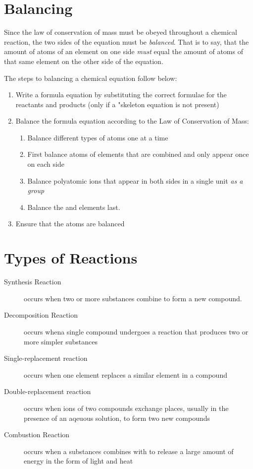 \section{Balancing}
Since the law of conservation of mass must be obeyed throughout a chemical
reaction, the two sides of the equation must be \textit{balanced}.  That is to
say, that the amount of atoms of an element on one side \textit{must} equal the
amount of atoms of that same element on the other side of the equation.

The steps to balancing a chemical equation follow below:

\begin{enumerate}
  \item Write a formula equation by substituting the correct formulae for the
    reactants and products (only if a "skeleton equation is not present)
  \item Balance the formula equation according to the Law of Conservation of
    Mass:
    \begin{enumerate}
      \item Balance different types of atoms one at a time
      \item First balance atoms of elements that are combined and only appear
        once on each side
      \item Balance polyatomic ions that appear in both sides in a single unit
        \textit{as a group}
      \item Balance the  and  elements last.
    \end{enumerate}
  \item Ensure that the atoms are balanced
\end{enumerate}

\section{Types of Reactions}
\begin{description}
  \item[Synthesis Reaction] occurs when two or more substances combine to form a
    new compound.
  \item[Decomposition Reaction] occurs whena  single compound undergoes a
    reaction that produces two or more simpler substances
  \item[Single-replacement reaction] occurs when one element replaces a similar
    element in a compound
  \item[Double-replacement reaction] occurs when ions of two compounds exchange
    places, usually in the presence of an aqeuous solution, to form two new
    compounds
  \item[Combustion Reaction] occurs when a substances combines with  to
    release a large amount of energy in the form of light and heat
\end{description}

